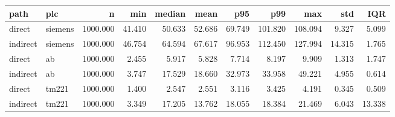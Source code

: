 \begin{tabular}{llrrrrrrrrr}
\toprule
path & plc & n & min & median & mean & p95 & p99 & max & std & IQR \\
\midrule
direct & siemens & 1000.000 & 41.410 & 50.633 & 52.686 & 69.749 & 101.820 & 108.094 & 9.327 & 5.099 \\
indirect & siemens & 1000.000 & 46.754 & 64.594 & 67.617 & 96.953 & 112.450 & 127.994 & 14.315 & 1.765 \\
direct & ab & 1000.000 & 2.455 & 5.917 & 5.828 & 7.714 & 8.197 & 9.909 & 1.313 & 1.747 \\
indirect & ab & 1000.000 & 3.747 & 17.529 & 18.660 & 32.973 & 33.958 & 49.221 & 4.955 & 0.614 \\
direct & tm221 & 1000.000 & 1.400 & 2.547 & 2.551 & 3.116 & 3.425 & 4.191 & 0.345 & 0.509 \\
indirect & tm221 & 1000.000 & 3.349 & 17.205 & 13.762 & 18.055 & 18.384 & 21.469 & 6.043 & 13.338 \\
\bottomrule
\end{tabular}

